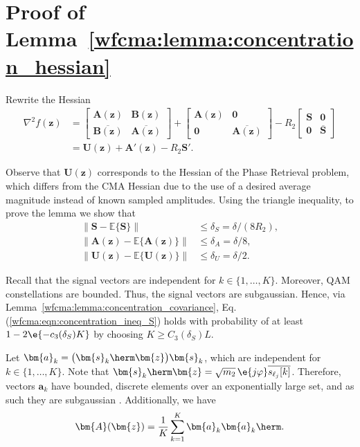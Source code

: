 \section{Proof of Lemma~\ref{wfcma:lemma:concentration_hessian}}\label{wfcma:appdx:concentration_hessian}

Rewrite the Hessian
\begin{align}
	\nabla^2f(\bm{z})&=\begin{bmatrix}
		\bm{A}(\bm{z})&\bm{B}(\bm{z})\\%
		\overline{\bm{B}(\bm{z})}&\overline{\bm{A}(\bm{z})}
	\end{bmatrix}+\begin{bmatrix}
		\bm{A}(\bm{z})&\bm{0}\\%
		\bm{0}&\overline{\bm{A}(\bm{z})}\end{bmatrix}
	-R_2\begin{bmatrix}
		\bm{S}&\bm{0}\\%
		\bm{0}&\overline{\bm{S}}\end{bmatrix}\nonumber\\
	&=\bm{U}(\bm{z})+\bm{A}'(\bm{z})-R_2\bm{S}'.\nonumber
\end{align}

Observe that $\bm{U}(\bm{z})$ corresponds to the Hessian of the Phase Retrieval problem, which differs from the CMA Hessian due to the use of a desired average magnitude instead of known sampled amplitudes. Using the triangle inequality, to prove the lemma we show that
\begin{align}
	\big\|\bm{S}-\mathbb{E}\{\bm{S}\}\big\|&\leq \delta_S={\delta}/{(8R_2)}, \label{wfcma:eqn:concentration_ineq_S}\\
	\big\|\bm{A}(\bm{z})-\mathbb{E}\{\bm{A}(\bm{z})\}\big\|&\leq \delta_A={\delta}/{8}, \label{wfcma:eqn:concentration_ineq_A}\\
	\|\bm{U}(\bm{z})-\mathbb{E}\{\bm{U}(\bm{z})\}\|&\leq 
	\delta_U={\delta}/{2}. \label{wfcma:eqn:concentration_ineq_U}
\end{align}

Recall that the signal vectors are independent for $k\in\{1,\ldots,K\}$. Moreover, QAM constellations are bounded. Thus, the signal vectors are subgaussian. Hence, via Lemma~\ref{wfcma:lemma:concentration_covariance},  Eq.(\ref{wfcma:eqn:concentration_ineq_S}) holds with probability of at least $1-2\e{-c_3(\delta_S)K}$ by choosing $K\geq C_3(\delta_S)L$.

Let $\bm{a}_k= \big(\bm{s}_k\herm\bm{z}\big) \bm{s}_k$, which are independent for $k\in\{1,\ldots,K\}$. Note that $\bm{s}_k\herm\bm{z}=\sqrt{m_2}\,\e{j\varphi}\overline{s_{\ell_j}[k]}$. Therefore, vectors $\bm{a}_k$ have bounded, discrete elements over an exponentially large set, and as such they are subgaussian \cite{Vershynin2018hdprobability}. Additionally, we have
\begin{align}
	\bm{A}(\bm{z})= \frac{1}{K}\sum_{k=1}^K \bm{a}_k\bm{a}_k\herm.\nonumber
\end{align}

